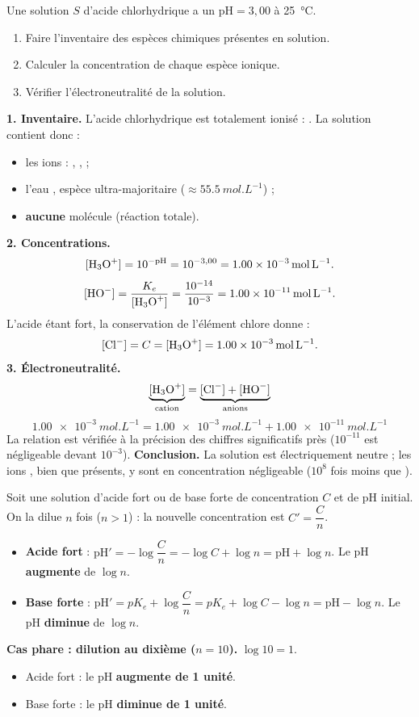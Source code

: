 \documentclass[11pt]{article}
\newcounter{popsec}
\newcounter{popsub}
\newcommand{\courssub}[1]{%
  \stepcounter{popsub}%
  \par\vspace{9pt}\noindent{\popxbold\fontsize{11.5}{13}\selectfont\color{popink}{\color{poporange}\thepopsec.\thepopsub}\hspace{6pt}#1}\par\nopagebreak\vspace{4pt}
}
\begin{document}
\begin{exoresolu}
Une solution $S$ d'acide chlorhydrique a un $\text{pH} = 3,00$ à \SI{25}{\celsius}.
\begin{enumerate}
\item Faire l'inventaire des espèces chimiques présentes en solution.
\item Calculer la concentration de chaque espèce ionique.
\item Vérifier l'électroneutralité de la solution.
\end{enumerate}
\tcblower
\textbf{1. Inventaire.} L'acide chlorhydrique est totalement ionisé : . La solution contient donc :
\begin{itemize}
\item les ions : , ,  ;
\item l'eau , espèce ultra-majoritaire ($\approx \SI{55,5}{mol.L^{-1}}$) ;
\item \textbf{aucune} molécule  (réaction totale).
\end{itemize}
\textbf{2. Concentrations.}
\[ [\ce{H3O+}] = 10^{-\text{pH}} = 10^{-3,00} = \SI{1,00e-3}{mol.L^{-1}}. \]
\[ [\ce{HO-}] = \frac{K_e}{[\ce{H3O+}]} = \frac{10^{-14}}{10^{-3}} = \SI{1,00e-11}{mol.L^{-1}}. \]
L'acide étant fort, la conservation de l'élément chlore donne :
\[ [\ce{Cl-}] = C = [\ce{H3O+}] = \SI{1,00e-3}{mol.L^{-1}}. \]
\textbf{3. Électroneutralité.}
\[ \underbrace{[\ce{H3O+}]}_{\text{cation}} = \underbrace{[\ce{Cl-}] + [\ce{HO-}]}_{\text{anions}} \]
\[ \SI{1,00e-3}{mol.L^{-1}} = \SI{1,00e-3}{mol.L^{-1}} + \SI{1,00e-11}{mol.L^{-1}} \]
La relation est vérifiée à la précision des chiffres significatifs près ($10^{-11}$ est négligeable devant $10^{-3}$).
\textbf{Conclusion.} La solution est électriquement neutre ; les ions , bien que présents, y sont en concentration négligeable ($10^8$ fois moins que ).
\end{exoresolu}

\courssub{4. Effet de la dilution sur le pH}

\begin{propriete}
Soit une solution d'acide fort ou de base forte de concentration $C$ et de pH initial. On la dilue $n$ fois ($n > 1$) : la nouvelle concentration est $C' = \dfrac{C}{n}$.
\begin{itemize}
\item \textbf{Acide fort} : $\text{pH}' = -\log\dfrac{C}{n} = -\log C + \log n = \text{pH} + \log n$. Le pH \textbf{augmente} de $\log n$.
\item \textbf{Base forte} : $\text{pH}' = pK_e + \log\dfrac{C}{n} = pK_e + \log C - \log n = \text{pH} - \log n$. Le pH \textbf{diminue} de $\log n$.
\end{itemize}
\textbf{Cas phare : dilution au dixième ($n=10$).} $\log 10 = 1$.
\begin{itemize}
\item Acide fort : le pH \textbf{augmente de 1 unité}.
\item Base forte : le pH \textbf{diminue de 1 unité}.
\end{itemize}
\end{propriete}
\end{document}
